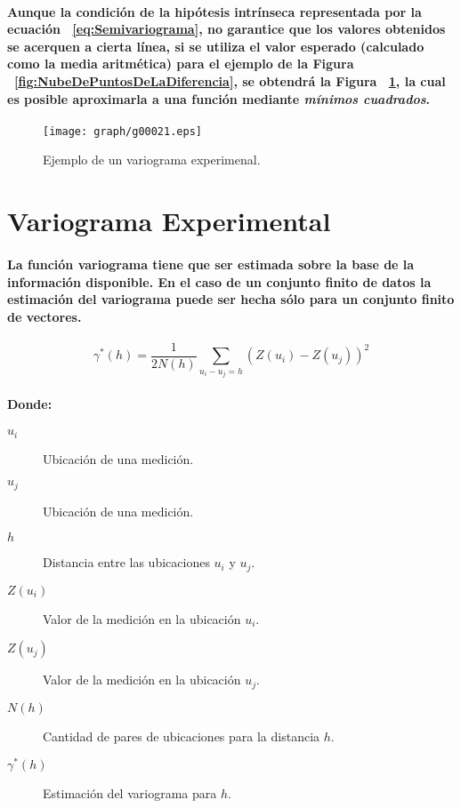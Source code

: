 \paragraph{
Aunque la condición de la hipótesis intrínseca representada por la ecuación ~\ref{eq:Semivariograma}, no garantice que los valores obtenidos se acerquen a cierta línea, si se utiliza el valor esperado (calculado como la media aritmética) para el ejemplo de la Figura ~\ref{fig:NubeDePuntosDeLaDiferencia}, se obtendrá la Figura ~\ref{fig:MediaDeLasDiferenciasParaCadaH}, la cual es posible aproximarla a una función mediante \emph{mínimos cuadrados}.
}
\begin{figure}[ht]
\centering
\texttt{[image: graph/g00021.eps]}
\caption[Variograma Experimental]{Ejemplo de un variograma experimenal.}
\label{fig:MediaDeLasDiferenciasParaCadaH}
\end{figure}



\section{Variograma Experimental}
\paragraph{
La función variograma tiene que ser estimada sobre la base de la información disponible. En el caso de un conjunto finito de datos la estimación del variograma puede ser hecha sólo para un conjunto finito de vectores.
}
\begin{equation}
\gamma^*(h)=\frac{1}{2N(h)} \sum_{u_i-u_j=h} (Z(u_i) - Z(u_j))^2
\end{equation}
\paragraph{
Donde:
}
\begin{description}
\item[$u_i$] Ubicación de una medición.
\item[$u_j$] Ubicación de una medición.
\item[$h$] Distancia entre las ubicaciones $u_i$ y $u_j$.
\item[$Z(u_i)$] Valor de la medición en la ubicación $u_i$.
\item[$Z(u_j)$] Valor de la medición en la ubicación $u_j$.
\item[$N(h)$] Cantidad de pares de ubicaciones para la distancia $h$.
\item[$\gamma^*(h)$] Estimación del variograma para $h$.
\end{description}
